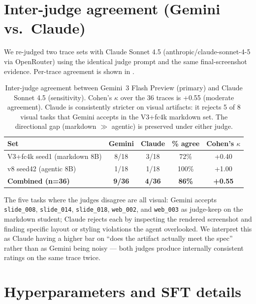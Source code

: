 \documentclass[11pt]{article}
\begin{document}
\section{Inter-judge agreement (Gemini vs.\ Claude)}
\label{app:interjudge}

We re-judged two trace sets with Claude Sonnet 4.5 (anthropic/claude-sonnet-4-5 via OpenRouter) using the identical judge prompt and the same final-screenshot evidence. Per-trace agreement is shown in .

\begin{table}[ht]
\centering
\caption{Inter-judge agreement between Gemini~3 Flash Preview (primary) and Claude Sonnet 4.5 (sensitivity). Cohen's $\kappa$ over the 36 traces is +0.55 (moderate agreement). Claude is consistently stricter on visual artifacts: it rejects 5 of 8 visual tasks that Gemini accepts in the V3+fc4k markdown set. The directional gap (markdown $\gg$ agentic) is preserved under either judge.}
\label{tab:interjudge}
\small
\begin{tabular}{lcccc}
\toprule
Set & Gemini & Claude & \% agree & Cohen's $\kappa$ \\
\midrule
V3+fc4k seed1 (markdown 8B) & 8/18 & 3/18 & 72\% & +0.40 \\
v8 seed42 (agentic 8B) & 1/18 & 1/18 & 100\% & +1.00 \\
\midrule
\textbf{Combined (n=36)} & \textbf{9/36} & \textbf{4/36} & \textbf{86\%} & \textbf{+0.55} \\
\bottomrule
\end{tabular}
\end{table}

The five tasks where the judges disagree are all visual: Gemini accepts \texttt{slide\_008}, \texttt{slide\_014}, \texttt{slide\_018}, \texttt{web\_002}, and \texttt{web\_003} as judge-keep on the markdown student; Claude rejects each by inspecting the rendered screenshot and finding specific layout or styling violations the agent overlooked. We interpret this as Claude having a higher bar on ``does the artifact actually meet the spec'' rather than as Gemini being noisy --- both judges produce internally consistent ratings on the same trace twice.

\section{Hyperparameters and SFT details}
\label{app:hyperparams}
\end{document}
